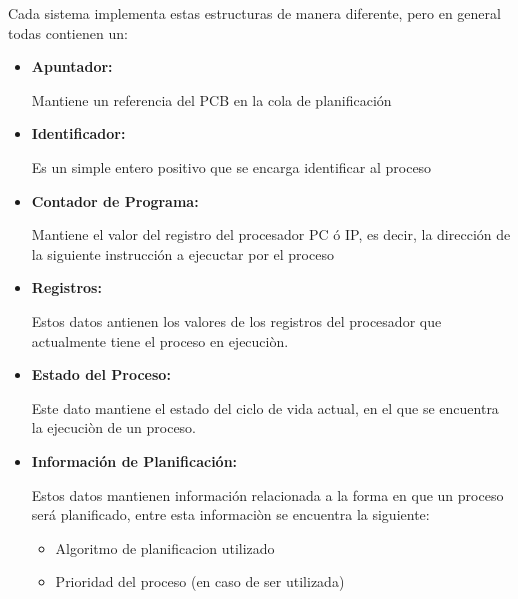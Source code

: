 \documentclass[12pt, fleqn]{report}                             %
\begin{document}
            Cada sistema implementa estas estructuras de manera diferente, pero en general
            todas contienen un:

            \begin{itemize}
                \item
                    \textbf{Apuntador:}

                    Mantiene un referencia del PCB en la cola de planificación

                \item
                    \textbf{Identificador:}

                    Es un simple entero positivo que se encarga identificar al proceso

                \item
                    \textbf{Contador de Programa:}

                    Mantiene el valor del registro del procesador PC ó IP, es decir, la dirección
                    de la siguiente instrucción a ejecuctar por el proceso

                \item
                    \textbf{Registros:}

                    Estos datos antienen los valores de los registros del procesador que actualmente
                    tiene el proceso en ejecuciòn.
                \item
                    \textbf{Estado del Proceso:}

                    Este dato mantiene el estado del ciclo de vida actual, en el que se encuentra
                    la ejecuciòn de un proceso.

                \item
                    \textbf{Información de Planificación:}

                        Estos datos mantienen información relacionada a la forma en que un proceso será
                        planificado, entre esta informaciòn se encuentra la siguiente: 

                            \begin{itemize}
                                \item Algoritmo de planificacion utilizado 
                                \item Prioridad del proceso (en caso de ser utilizada)
                            \end{itemize}


\end{itemize}
\end{document}
